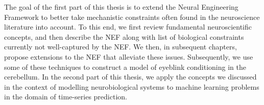 The goal of the first part of this thesis is to extend the Neural Engineering Framework to better take mechanistic constraints often found in the neuroscience literature into account.
To this end, we first review fundamental neuroscientific concepts, and then describe the NEF along with list of biological constraints currently not well-captured by the NEF.
We then, in subsequent chapters, propose extensions to the NEF that alleviate these issues.
Subsequently, we use some of these techniques to construct a model of eyeblink conditioning in the cerebellum.
In the second part of this thesis, we apply the concepts we discussed in the context of modelling neurobiological systems to machine learning problems in the domain of time-series prediction.
